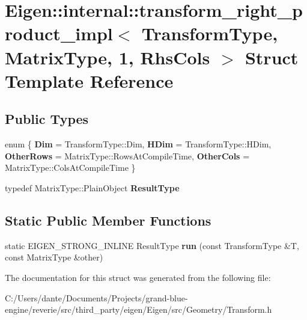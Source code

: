 \hypertarget{struct_eigen_1_1internal_1_1transform__right__product__impl_3_01_transform_type_00_01_matrix_type_00_011_00_01_rhs_cols_01_4}{}\section{Eigen\+::internal\+::transform\+\_\+right\+\_\+product\+\_\+impl$<$ Transform\+Type, Matrix\+Type, 1, Rhs\+Cols $>$ Struct Template Reference}
\label{struct_eigen_1_1internal_1_1transform__right__product__impl_3_01_transform_type_00_01_matrix_type_00_011_00_01_rhs_cols_01_4}
\subsection*{Public Types}
\begin{DoxyCompactItemize}
\item 
\mbox{\label{struct_eigen_1_1internal_1_1transform__right__product__impl_3_01_transform_type_00_01_matrix_type_00_011_00_01_rhs_cols_01_4_a9653c6f841c99bc6a597f6f019ff75de}} 
enum \{ {\bfseries Dim} = Transform\+Type\+::Dim, 
{\bfseries H\+Dim} = Transform\+Type\+::H\+Dim, 
{\bfseries Other\+Rows} = Matrix\+Type\+::Rows\+At\+Compile\+Time, 
{\bfseries Other\+Cols} = Matrix\+Type\+::Cols\+At\+Compile\+Time
 \}
\item 
\mbox{\label{struct_eigen_1_1internal_1_1transform__right__product__impl_3_01_transform_type_00_01_matrix_type_00_011_00_01_rhs_cols_01_4_a2a1ca35510e3f48eff5f8c57d5bfd3e6}} 
typedef Matrix\+Type\+::\+Plain\+Object {\bfseries Result\+Type}
\end{DoxyCompactItemize}
\subsection*{Static Public Member Functions}
\begin{DoxyCompactItemize}
\item 
\mbox{\label{struct_eigen_1_1internal_1_1transform__right__product__impl_3_01_transform_type_00_01_matrix_type_00_011_00_01_rhs_cols_01_4_ade517193be757295c56845061de342fe}} 
static E\+I\+G\+E\+N\+\_\+\+S\+T\+R\+O\+N\+G\+\_\+\+I\+N\+L\+I\+NE Result\+Type {\bfseries run} (const Transform\+Type \&T, const Matrix\+Type \&other)
\end{DoxyCompactItemize}


The documentation for this struct was generated from the following file\+:\begin{DoxyCompactItemize}
\item 
C\+:/\+Users/dante/\+Documents/\+Projects/grand-\/blue-\/engine/reverie/src/third\+\_\+party/eigen/\+Eigen/src/\+Geometry/Transform.\+h\end{DoxyCompactItemize}
